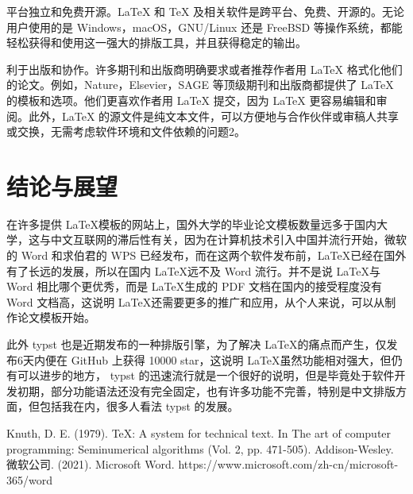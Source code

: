 \documentclass[UTF8]{ctexart}
\begin{document}
平台独立和免费开源。LaTeX 和 TeX 及相关软件是跨平台、免费、开源的。无论用户使用的是 Windows，macOS，GNU/Linux 还是 FreeBSD 等操作系统，都能轻松获得和使用这一强大的排版工具，并且获得稳定的输出。

利于出版和协作。许多期刊和出版商明确要求或者推荐作者用 LaTeX 格式化他们的论文。例如，Nature，Elsevier，SAGE 等顶级期刊和出版商都提供了 LaTeX 的模板和选项。他们更喜欢作者用 LaTeX 提交，因为 LaTeX 更容易编辑和审阅。此外，LaTeX 的源文件是纯文本文件，可以方便地与合作伙伴或审稿人共享或交换，无需考虑软件环境和文件依赖的问题2。

\section{结论与展望}
在许多提供 \LaTeX 模板的网站上，国外大学的毕业论文模板数量远多于国内大学，这与中文互联网的滞后性有关，因为在计算机技术引入中国并流行开始，微软的 Word 和求伯君的 WPS 已经发布，而在这两个软件发布前，\LaTeX 已经在国外有了长远的发展，所以在国内 \LaTeX 远不及 Word 流行。并不是说 \LaTeX 与 Word 相比哪个更优秀，而是 \LaTeX 生成的 PDF 文档在国内的接受程度没有 Word 文档高，这说明 \LaTeX 还需要更多的推广和应用，从个人来说，可以从制作论文模板开始。

此外 typst 也是近期发布的一种排版引擎，为了解决 \LaTeX 的痛点而产生，仅发布6天内便在 GitHub 上获得 10000 star，这说明 \LaTeX 虽然功能相对强大，但仍有可以进步的地方， typst 的迅速流行就是一个很好的说明，但是毕竟处于软件开发初期，部分功能语法还没有完全固定，也有许多功能不完善，特别是中文排版方面，但包括我在内，很多人看法 typst 的发展。

\begin{thebibliography}{99}
     Knuth, D. E. (1979). TeX: A system for technical text. In The art of computer programming: Seminumerical algorithms (Vol. 2, pp. 471-505). Addison-Wesley.
     微软公司. (2021). Microsoft Word. https://www.microsoft.com/zh-cn/microsoft-365/word 
    
\end{thebibliography}
\end{document}

